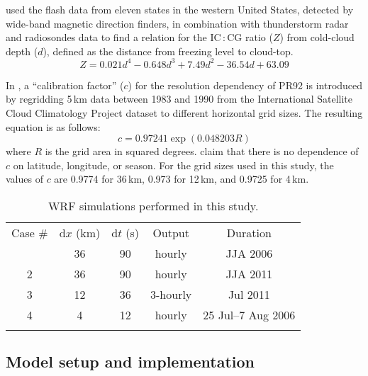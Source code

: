 \citet{Price:1993fk} used the flash data from eleven states in the western
United States, detected by wide-band magnetic direction finders, in
combination with thunderstorm radar and radiosondes data to find a relation
for the IC\,:\,CG ratio ($Z$) from cold-cloud depth ($d$), defined as the
distance from freezing level to cloud-top.
\begin{equation}\label{eq:Z}
Z = 0.021d^4-0.648d^3+7.49d^2-36.54d + 63.09
\end{equation}

In \citet{Price:1994fk}, a ``calibration factor'' ($c$) for the resolution
dependency of PR92 is introduced by regridding 5\,\unit{km} data between 1983
and 1990 from the International Satellite Cloud Climatology Project dataset
\citep[ISCCP;][]{Rossow:1991aa} to different horizontal grid sizes. The
resulting equation is as follows:
      \begin{equation}\label{eq:calib}
            c = 0.97241\exp(0.048203R)
      \end{equation}
where $R$ is the grid area in squared degrees. \citet{Price:1994fk} claim
that there is no dependence of $c$ on latitude, longitude, or season. For the
grid sizes used in this study, the values of $c$ are 0.9774 for
36\,\unit{km}, 0.973 for 12\,\unit{km}, and 0.9725 for 4\,\unit{km}.


\begin{table}[t]
\caption{WRF simulations performed in this study.}
\begin{tabular}{ccccc} \tophline
Case \# & d$x$ (km) & d$t$ (\unit{s}) & Output &
Duration \\
\middlehline
1 & 36 & 90 & hourly & JJA 2006 \\
2 & 36 & 90 & hourly & JJA 2011 \\
3 & 12 & 36 & 3-hourly &Jul 2011 \\
4 & 4 & 12 & hourly &25 Jul--7 Aug 2006 \\
\bottomhline
\end{tabular}
\label{tab:lightning/setup}
\end{table}

\subsection{Model setup and implementation}\label{ssec:lightning/model}

